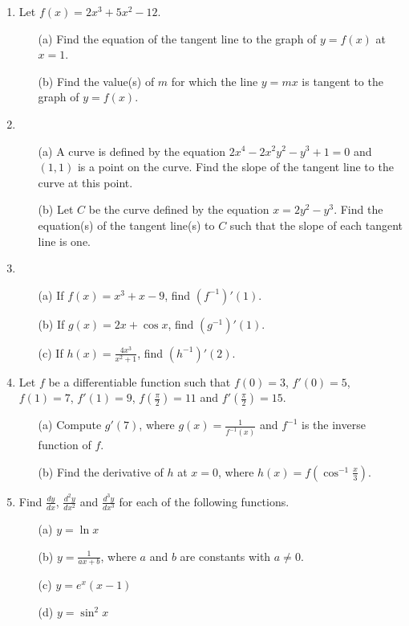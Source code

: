 \documentclass[12pt]{article}
\newcommand{\ds}{\displaystyle}
\begin{document}
\begin{enumerate}
\item
Let $f(x) = 2x^3 + 5x^2 - 12$.
\begin{enumerate}
\item[(a)]
Find the equation of the tangent line to the graph of $y = f(x)$ at $x = 1$.
\item[(b)]
Find the value(s) of $m$ for which the line $y=mx$ is tangent to the graph of $y = f(x)$.
\end{enumerate}

\item
\begin{enumerate}
\item[(a)]
A curve is defined by the equation $2x^4 - 2x^2y^2 - y^3 + 1 = 0$ and $(1, 1)$ is a point on the curve. Find the slope of the tangent line to the curve at this point.
\item[(b)]
Let $C$ be the curve defined by the equation $x = 2y^2 - y^3$. Find the equation(s) of the tangent line(s) to $C$ such that the slope of each tangent line is one.
\end{enumerate}

\item
\begin{enumerate}
\item[(a)]
If $f(x)=x^3+x-9$, find $\left(f^{-1}\right)'(1)$.
\item[(b)]
If $g(x)=2x+\cos x$, find $\left(g^{-1}\right)'(1)$.
\item[(c)]
If $\ds h(x)=\frac{4x^3}{x^2 + 1}$, find $\left(h^{-1}\right)'(2)$.
\end{enumerate}

\item
Let $f$ be a differentiable function such that $f(0) = 3$, $f'(0) = 5$, $f(1) = 7$, $f'(1) = 9$, $\ds f\left(\frac{\pi}{2}\right) = 11$ and $\ds f'\left(\frac{\pi}{2}\right) = 15$.
\begin{enumerate}
\item[(a)]
Compute $g'(7)$, where $\ds g(x) = \frac{1}{f^{-1}(x)}$ and $f^{-1}$ is the inverse function of $f$.
\item[(b)]
Find the derivative of $h$ at $x = 0$, where $\ds h(x) = f\left(\cos^{-1}\frac{x}{3}\right)$.
\end{enumerate}

\item
Find $\ds \frac{dy}{dx}$, $\ds \frac{d^2 y}{dx^2}$ and $\ds \frac{d^3 y}{dx^3}$ for each of the following functions.
\begin{enumerate}
\item[(a)]
$y = \ln x$
\item[(b)]
$\ds y = \frac{1}{ax+b}$, where $a$ and $b$ are constants with $a \ne 0$.
\item[(c)]
$y = e^x(x-1)$
\item[(d)]
$y = \sin^2 x$
\end{enumerate}


\end{enumerate}
\end{document}
